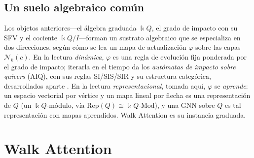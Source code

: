 \documentclass[runningheads]{llncs}
\newcommand{\kk}{\Bbbk}
\newcommand{\kQ}{\kk Q}
\begin{document}
\subsection{Un suelo algebraico común}\label{sec:ground}

Los objetos anteriores---el álgebra graduada $\kQ$, el grado de impacto con su
SFV y el cociente $\kQ/I$---forman un sustrato algebraico que se especializa en
dos direcciones, según cómo se lea un mapa de actualización $\varphi$ sobre las
capas $\mathcal{N}_k(c)$. En la lectura \emph{dinámica}, $\varphi$ es una regla
de evolución fija ponderada por el grado de impacto; iterarla en el tiempo da
los \emph{autómatas de impacto sobre quivers} (AIQ), con sus reglas SI/SIS/SIR
y su estructura categórica, desarrollados aparte
\cite{zainea2026aiq,ibanez2025casimulations}. En la lectura
\emph{representacional}, tomada aquí, $\varphi$ se \emph{aprende}: un espacio
vectorial por vértice y un mapa lineal por flecha es una representación de $Q$
(un $\kQ$-módulo, vía $\mathrm{Rep}(Q)\cong\kQ\text{-}\mathrm{Mod}$), y una GNN
sobre $Q$ es tal representación con mapas aprendidos. Walk Attention es su
instancia graduada.

\section{Walk Attention}\label{sec:model}
\end{document}
